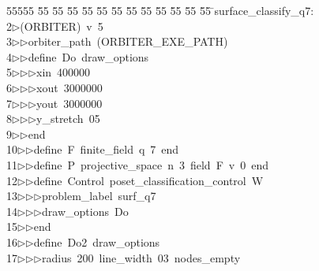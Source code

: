 %
%
\begin{tabbing}
55555 \= 55 \= 55 \= 55 \= 55 \= 55 \= 55 \= 55 \= 55 \= 55 \= 55 \= 55 \= 55 \= \>surface\_classify\_q7:\\[0pt]
2\>$\triangleright$\>(ORBITER)\ v\ 5\ \\[0pt]
3\>$\triangleright$\>$\triangleright$\>orbiter\_path\ (ORBITER\_EXE\_PATH)\ \\[0pt]
4\>$\triangleright$\>$\triangleright$\>define\ Do\ draw\_options\ \\[0pt]
5\>$\triangleright$\>$\triangleright$\>$\triangleright$\>xin\ 400000\ \\[0pt]
6\>$\triangleright$\>$\triangleright$\>$\triangleright$\>xout\ 3000000\ \\[0pt]
7\>$\triangleright$\>$\triangleright$\>$\triangleright$\>yout\ 3000000\ \\[0pt]
8\>$\triangleright$\>$\triangleright$\>$\triangleright$\>y\_stretch\ 05\ \\[0pt]
9\>$\triangleright$\>$\triangleright$\>end\ \\[0pt]
10\>$\triangleright$\>$\triangleright$\>define\ F\ finite\_field\ q\ 7\ end\ \\[0pt]
11\>$\triangleright$\>$\triangleright$\>define\ P\ projective\_space\ n\ 3\ field\ F\ v\ 0\ end\ \\[0pt]
12\>$\triangleright$\>$\triangleright$\>define\ Control\ poset\_classification\_control\ W\ \\[0pt]
13\>$\triangleright$\>$\triangleright$\>$\triangleright$\>problem\_label\ surf\_q7\ \\[0pt]
14\>$\triangleright$\>$\triangleright$\>$\triangleright$\>draw\_options\ Do\ \\[0pt]
15\>$\triangleright$\>$\triangleright$\>end\ \\[0pt]
16\>$\triangleright$\>$\triangleright$\>define\ Do2\ draw\_options\ \\[0pt]
17\>$\triangleright$\>$\triangleright$\>$\triangleright$\>radius\ 200\ line\_width\ 03\ nodes\_empty\ \\[0pt]

\end{tabbing}
